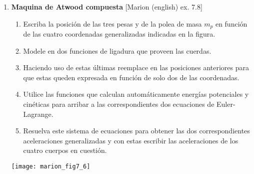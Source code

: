 \documentclass[11pt, spanish, a4paper, twoside]{article}
\begin{document}
\begin{enumerate}
\item
\begin{minipage}[t][6cm]{0.6\textwidth}
	\textbf{Maquina de Atwood compuesta} [Marion (english) ex. 7.8]\\ 
	\begin{enumerate}
		\item Escriba la posición de las tres pesas y de la polea de masa \(m_p\) en función de las cuatro coordenadas generalizadas indicadas en la figura.
		\item Modele en dos funciones de ligadura que proveen las cuerdas.
		\item Haciendo uso de estas últimas reemplace en las posiciones anteriores para que estas queden expresada en función de solo dos de las coordenadas.
		\item Utilice las funciones que calculan automáticamente energías potenciales y cinéticas para arribar a las correspondientes dos ecuaciones de Euler-Lagrange.
		\item Resuelva este sistema de ecuaciones para obtener las dos correspondientes aceleraciones generalizadas y con estas escribir las aceleraciones de los cuatro cuerpos en cuestión.
	\end{enumerate}
\end{minipage}
\begin{minipage}[c][0.5em][t]{0.3\textwidth}
	\texttt{[image: marion\_fig7\_6]}
\end{minipage}


\end{enumerate}
\end{document}
